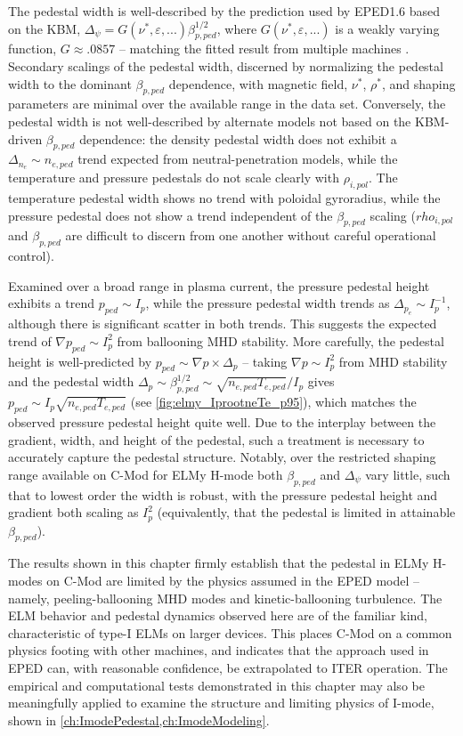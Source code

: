 The pedestal width is well-described by the prediction used by EPED1.6 based on the KBM, $\Delta_\psi = G(\nu^*,\varepsilon,...) \beta_{p,ped}^{1/2}$, where $G(\nu^*,\varepsilon,...)$ is a weakly varying function, $G \approx .0857$ -- matching the fitted result from multiple machines \cite{Groebner2013}.  Secondary scalings of the pedestal width, discerned by normalizing the pedestal width to the dominant $\beta_{p,ped}$ dependence, with magnetic field, $\nu^*$, $\rho^*$, and shaping parameters are minimal over the available range in the data set.  Conversely, the pedestal width is not well-described by alternate models not based on the KBM-driven $\beta_{p,ped}$ dependence: the density pedestal width does not exhibit a $\Delta_{n_e} \sim n_{e,ped}$ trend expected from neutral-penetration models, while the temperature and pressure pedestals do not scale clearly with $\rho_{i,pol}$.  The temperature pedestal width shows no trend with poloidal gyroradius, while the pressure pedestal does not show a trend independent of the $\beta_{p,ped}$ scaling ($rho_{i,pol}$ and $\beta_{p,ped}$ are difficult to discern from one another without careful operational control).

Examined over a broad range in plasma current, the pressure pedestal height exhibits a trend $p_{ped} \sim I_p$, while the pressure pedestal width trends as $\Delta_{p_e} \sim I_p^{-1}$, although there is significant scatter in both trends.  This suggests the expected trend of $\nabla p_{ped} \sim I_p^2$ from ballooning MHD stability.  More carefully, the pedestal height is well-predicted by $p_{ped} \sim \nabla p \times \Delta_{p}$ -- taking $\nabla p \sim I_p^2$ from MHD stability and the pedestal width $\Delta_{p} \sim \beta_{p,ped}^{1/2} \sim \sqrt{n_{e,ped} T_{e,ped}}/I_p$ gives $p_{ped} \sim I_p \sqrt{n_{e,ped} T_{e,ped}}$ (see \cref{fig:elmy_IprootneTe_p95}), which matches the observed pressure pedestal height quite well.  Due to the interplay between the gradient, width, and height of the pedestal, such a treatment is necessary to accurately capture the pedestal structure.  Notably, over the restricted shaping range available on C-Mod for ELMy H-mode both $\beta_{p,ped}$ and $\Delta_\psi$ vary little, such that to lowest order the width is robust, with the pressure pedestal height and gradient both scaling as $I_p^2$ (equivalently, that the pedestal is limited in attainable $\beta_{p,ped}$).

The results shown in this chapter firmly establish that the pedestal in ELMy H-modes on C-Mod are limited by the physics assumed in the EPED model -- namely, peeling-ballooning MHD modes and kinetic-ballooning turbulence.  The ELM behavior and pedestal dynamics observed here are of the familiar kind, characteristic of type-I ELMs on larger devices.  This places C-Mod on a common physics footing with other machines, and indicates that the approach used in EPED can, with reasonable confidence, be extrapolated to ITER operation.  The empirical and computational tests demonstrated in this chapter may also be meaningfully applied to examine the structure and limiting physics of I-mode, shown in \cref{ch:ImodePedestal,ch:ImodeModeling}.\nicechapterending


